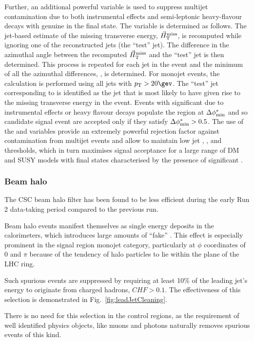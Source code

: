 Further, an additional powerful variable \bdphi is used to suppress
multijet contamination due to both instrumental effects and
semi-leptonic heavy-flavour decays with genuine \met in the final
state. The variable is determined as follows. The jet-based estimate
of the missing transverse energy, ${\mbox{$\vec{H}_{\rm T}^{\rm miss}$}}$, is recomputed while
ignoring one of the reconstructed jets (the ``test'' jet). The
difference in the azimuthal angle between the recomputed $\mbox{$\vec{H}_{\rm T}^{\rm miss}$}$
and the ``test'' jet is then determined. This process is repeated for
each jet in the event and the minimum of all the azimuthal
differences, \bdphi, is determined. For monojet events, the calculation is 
performed using all jets with $\Pt > 20\gev$. 
The ``test'' jet corresponding to \bdphi is 
identified as the jet that is most likely to have given rise to the
missing transverse energy in the event. Events with significant \mht
due to instrumental effects or heavy flavour decays populate the
region at $\mbox{$\Delta\phi^{*}_{\rm min}$}$ and so candidate signal event are accepted
only if they satisfy $\mbox{$\Delta\phi^{*}_{\rm min}$} > 0.5$. The use of the \bdphi and \alphat
variables provide an extremely powerful rejection factor against
contamination from multijet events and allow to maintain low jet \PT,
\HT, and \mht thresholds, which in turn maximises signal acceptance
for a large range of DM and SUSY models with final states
characterised by the presence of significant \met.

  
\subsubsection{Beam halo}
\label{beam-halo-selection}

The CSC beam halo filter has been found to be less efficient during the early
Run 2 data-taking period compared to the previous run.

Beam halo events manifest themselves as single energy deposits in the
calorimeters, which introduces large amounts of ``fake'' \met. This effect is
especially prominent in the signal region monojet category, particularly at
$\phi$ coordinates of 0 and $\pi$ because of the tendency of halo particles to
lie within the plane of the LHC ring. 

Such spurious events are suppressed by requiring at least 10\% of the leading
jet's energy to originate from charged hadrons, $CHF>0.1$. The effectiveness of this selection
is demonstrated in Fig.~\ref{fig:leadJetCleaning}.

There is no need for this selection in the control regions, 
as the requirement of well identified physics objects, like muons 
and photons naturally removes spurious events of this kind. 

